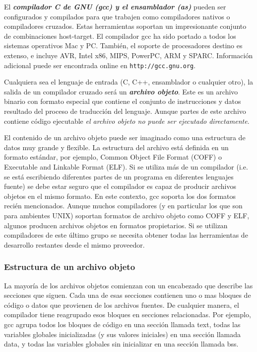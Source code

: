 \documentclass[output=paper, 
colorlinks,
citecolor=brown,
newtxmath
]{langscibook}
\begin{document}
El \textit{\textbf{compilador C de GNU (gcc) y el ensamblador (as)}} pueden ser configurados y compilados
para que trabajen como compiladores nativos o compiladores cruzados. 
Estas herramientas soportan
un impresionante conjunto de combinaciones host-target. El compilador gcc ha sido
portado a todos los sistemas operativos Mac y PC. También, el soporte de procesadores destino
es extenso, e incluye AVR, Intel x86, MIPS, PowerPC, ARM y SPARC. Información
adicional puede ser encontrada online en \texttt{http://gcc.gnu.org}.

Cualquiera sea el lenguaje de entrada (C, C++, ensamblador o cualquier otro), la salida
de un compilador cruzado será un \textit{\textbf{archivo objeto}}. Este es un archivo binario con
formato especial que contiene el conjunto de instrucciones y datos
resultado del proceso de traducción del lenguaje. Aunque partes de este archivo
contiene código ejecutable \textit{el archivo objeto no puede ser ejecutado directamente}.


El contenido de un archivo objeto puede ser imaginado como una estructura de datos
muy grande y flexible. La estructura del archivo está definida en un formato estándar, 
por ejemplo, Common Object File Format (COFF) o Executable and Linkable Format (ELF).
Si se utiliza más de un compilador (i.e. se está escribiendo diferentes partes de un programa
en diferentes lenguajes fuente) se debe estar seguro que el compilador es capaz
de producir archivos objetos en el mismo formato. En este contexto, gcc soporta 
los dos formatos recién mencionados. Aunque muchos compiladores (y en particular
los que son para ambientes UNIX) soportan formatos de archivo objeto como
COFF y ELF, algunos producen archivos objetos en formatos propietarios.
Si se utilizan compiladores de este último grupo se necesita obtener todas
las herramientas de desarrollo restantes desde el mismo proveedor.

\subsubsection*{Estructura de un archivo objeto}
La mayoría de los archivos objetos comienzan con un encabezado que describe las secciones
que siguen. Cada una de esas secciones contienen uno o mas bloques de código o datos que 
provienen de los archivos fuentes. De cualquier manera, el compilador tiene reagrupado
esos bloques en secciones relacionadas. Por ejemplo, gcc agrupa todos los bloques de
código en una sección llamada text, todas las variables globales inicializadas (y sus
valores iniciales) en una sección llamada data, y todas las variables globales sin 
inicializar en una sección llamada bss.
\end{document}
